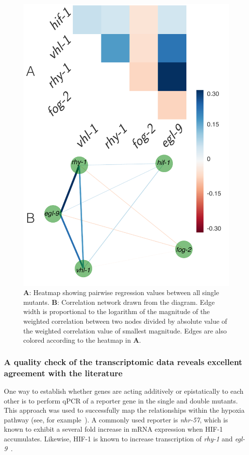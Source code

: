 \documentclass[9pt,twocolumn,twoside]{pnas-new}
\newcommand{\gene}[1]{\emph{#1}}
\newcommand{\nhr}{\emph{nhr-57}}
\newcommand{\hifp}{HIF-1}
\begin{document}
\begin{figure}[tbhp]
\centering
\includegraphics[width=\linewidth]{figs/bayesian_heat_map.pdf}
\caption{
\textbf{A}: Heatmap showing pairwise regression values between all
single mutants. \textbf{B}: Correlation network drawn from the diagram. Edge
width is proportional to the logarithm of the magnitude of the weighted
correlation between two nodes divided by absolute value of the weighted
correlation value of smallest magnitude. Edges are also colored according to the
heatmap in \textbf{A}.
}
\label{fig:heatmap}
\end{figure}

\subsubsection*{A quality check of the transcriptomic data reveals excellent agreement
            with the literature}
\label{sub:quality_check}
One way to establish whether genes are acting additively or epistatically to each
other is to perform qPCR of a reporter gene in the single and double mutants. This
approach was used to successfully map the relationships within the hypoxia
pathway (see, for example~\cite{Shao2009,Shen2006}). A commonly used reporter is
\nhr{}, which is known to exhibit a several fold increase in mRNA expression when
\hifp{} accumulates\cite{Shen2006,Shen2005,Ackerman2012,
Park2012}. Likewise, \hifp{} is known to increase transcription of \gene{rhy-1}
and \gene{egl-9}~\cite{Powell-Coffman2010}.
\end{document}
